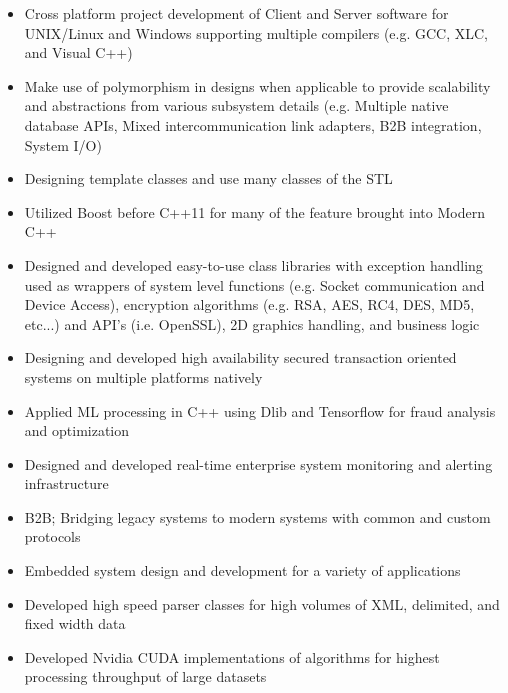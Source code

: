 \documentclass[10pt]{report}
\begin{document}
\begin{itemize}
\item Cross platform project development of Client and Server software for UNIX/Linux and Windows supporting multiple compilers (e.g. GCC, XLC, and Visual C++)
\item Make use of polymorphism in designs when applicable to provide scalability and abstractions from various subsystem details (e.g. Multiple native database APIs, Mixed intercommunication link adapters, B2B integration, System I/O)
\item Designing template classes and use many classes of the STL
\item Utilized Boost before C++11 for many of the feature brought into Modern C++
\item Designed and developed easy-to-use class libraries with exception handling used as wrappers of system level functions (e.g. Socket communication and Device Access), encryption algorithms (e.g. RSA, AES, RC4, DES, MD5, etc...) and API’s (i.e. OpenSSL), 2D graphics handling, and business logic 
\item Designing and developed high availability secured transaction oriented systems on multiple platforms natively
\item Applied ML processing in C++ using Dlib and Tensorflow for fraud analysis and optimization
\item Designed and developed real-time enterprise system monitoring and alerting infrastructure
\item B2B; Bridging legacy systems to modern systems with common and custom protocols
\item Embedded system design and development for a variety of applications
\item Developed high speed parser classes for high volumes of XML, delimited, and fixed width data
\item Developed Nvidia CUDA implementations of algorithms for highest processing throughput of large datasets
\end{itemize}
\end{document}
